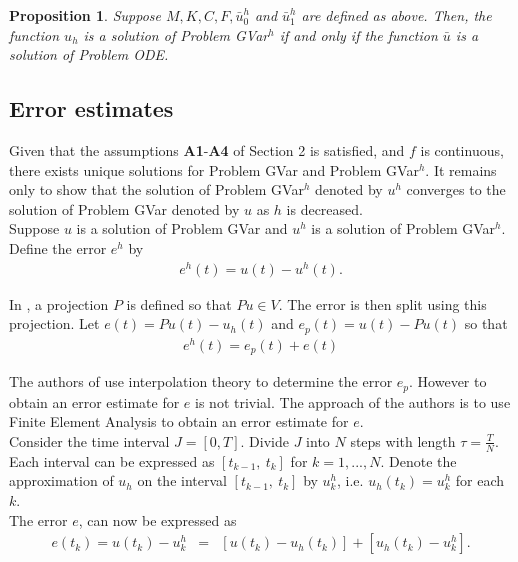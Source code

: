 \documentclass[../../main.tex]{subfiles}
\begin{document}
\newtheorem{DC_Prop3}[DC_Prop2]{Proposition}
\begin{DC_Prop3}
	Suppose $M, K, C, F,\bar{u}^h_0$ and $\bar{u}^h_1$ are defined as above. Then, the function $u_{h}$ is a solution of Problem GVar$^{h}$ if and only if the function $\bar{u}$ is a solution of Problem ODE.
\end{DC_Prop3}

\subsection{Error estimates}\label{e_est}
Given that the assumptions \textbf{A1}-\textbf{A4} of Section 2 is satisfied, and $f$ is continuous, there exists unique solutions for  Problem GVar and Problem GVar$^h$. It remains only to show that the solution of Problem GVar$^h$ denoted by $u^h$ converges to the solution of Problem GVar denoted by $u$ as $h$ is decreased.\\

Suppose $u$ is a solution of Problem GVar and $u^h$ is a solution of Problem GVar$^h$. Define the error $e^h$ by
\begin{eqnarray*}
	e^h(t) = u(t) - u^h(t).
\end{eqnarray*}

In \cite{BV13}, a projection $P$ is defined so that $Pu \in V$. The error is then split using this projection. Let $e(t) = Pu(t)- u_h(t)$ and $e_p(t) = u(t) - Pu(t)$ so that
\begin{eqnarray}
	e^h(t) = e_p(t) +e(t) \label{Error}
\end{eqnarray}

The authors of \cite{BV13} use interpolation theory to determine the error $e_p$. However to obtain an error estimate for $e$ is not trivial. The approach of the authors is to use Finite Element Analysis to obtain an error estimate for $e$.\\

Consider the time interval $J = [0,T]$. Divide $J$ into $N$ steps with length $\tau = \frac{T}{N}$. Each interval can be expressed as $[t_{k-1}, \ t_k]$ for $k = 1,...,N$. Denote the approximation of $u_h$ on the interval $[t_{k-1}, \ t_k]$ by $u_k^h$, i.e. $u_h(t_k) = u_k^h$ for each $k$.\\

The error $e$, can now be expressed as
\begin{eqnarray}
	e(t_k) = u(t_k) - u^h_k & = & [u(t_k)-u_h(t_k)] + [u_h(t_k) - u^h_k]. \label{error_e}
\end{eqnarray}
\end{document}
